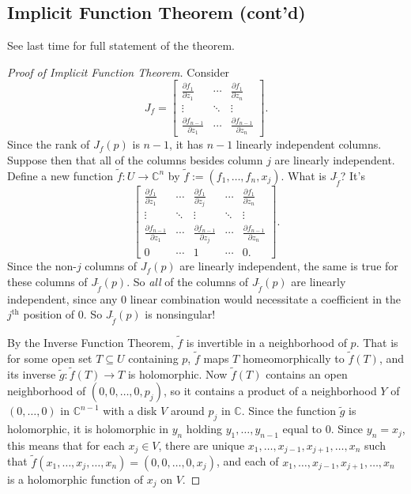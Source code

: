 \documentclass[12pt]{article}
\newcommand{\cx}{\mathbb{C}}
\newcommand{\ita}[1]{\textit{#1}}
\newcommand{\paren}[1]{\left( #1 \right)}
\theoremstyle{definition}
\theoremstyle{remark}
\begin{document}
\subsection{Implicit Function Theorem (cont'd)}
See last time for full statement of the theorem.
\begin{proof}[Proof of Implicit Function Theorem]
    Consider 
    \[
        J_f = 
        \begin{bmatrix}
            \frac{\partial f_1}{\partial z_1} & \cdots & \frac{\partial f_1}{\partial z_n} \\
            \vdots & \ddots & \vdots \\
            \frac{\partial f_{n-1}}{\partial z_1} & \cdots & \frac{\partial f_{n-1}}{\partial z_n}
        \end{bmatrix}.
    \]
    Since the rank of $J_f(p)$ is $n-1$, it has $n-1$ linearly independent columns. Suppose then that all of the columns besides column $j$ are linearly independent. Define a new function $\tilde{f} : U \to \cx^n$ by $\tilde{f} := \paren{ f_1 , \dotsc , f_n , x_j }$. What is $J_{\tilde{f}}$? It's
    \[
        \begin{bmatrix}
            \frac{\partial f_1}{\partial z_1} & \cdots & \frac{\partial f_1}{\partial z_j} & \cdots & \frac{\partial f_1}{\partial z_n} \\
            \vdots & \ddots & \vdots & \ddots & \vdots \\
            \frac{\partial f_{n-1}}{\partial z_1} & \cdots & \frac{\partial f_{n-1}}{\partial z_j} & \cdots & \frac{\partial f_{n-1}}{\partial z_n} \\
            0 & \cdots & 1 & \cdots & 0.
        \end{bmatrix}.
    \]
    Since the non-$j$ columns of $J_f(p)$ are linearly independent, the same is true for these columns of $J_{\tilde{f}}(p)$. So \ita{all} of the columns of $J_{\tilde{f}}(p)$ are linearly independent, since any $0$ linear combination would necessitate a coefficient in the $j^{\mathrm{th}}$ position of $0$. So $J_{\tilde{f}}(p)$ is nonsingular!
    
    By the Inverse Function Theorem, $\tilde{f}$ is invertible in a neighborhood of $p$. That is for some open set $T \subseteq U$ containing $p$, $\tilde{f}$ maps $T$ homeomorphically to $\tilde{f}(T)$, and its inverse $\tilde{g} : \tilde{f}(T) \to T$ is holomorphic. Now $\tilde{f}(T)$ contains an open neighborhood of $(0,0,\dotsc,0,p_j)$, so it contains a product of a neighborhood $Y$ of $(0,\dotsc,0)$ in $\cx^{n-1}$ with a disk $V$ around $p_j$ in $\cx$. Since the function $\tilde{g}$ is holomorphic, it is holomorphic in $y_n$ holding $y_1 , \dotsc , y_{n-1}$ equal to $0$. Since $y_n = x_j$, this means that for each $x_j \in V$, there are unique $x_1 , \dotsc , x_{j-1} , x_{j+1} , \dotsc , x_n$ such that $\tilde{f}(x_1 , \dotsc , x_j , \dotsc , x_n) = (0,0,\dotsc,0,x_j)$, and each of $x_1 , \dotsc , x_{j-1} , x_{j+1} , \dotsc , x_n$ is a holomorphic function of $x_j$ on $V$.
\end{proof}
\end{document}
